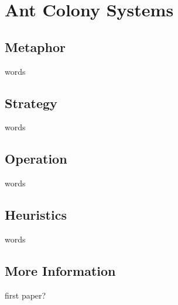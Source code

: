 %
%


%
% 
\section{Ant Colony Systems}
\label{sec:aco:acs}

%
%
\subsection{Metaphor}
words



%
%
\subsection{Strategy}
words



%
%
\subsection{Operation}
words


%
%
\subsection{Heuristics}
words



%
%
\subsection{More Information}
first paper?



